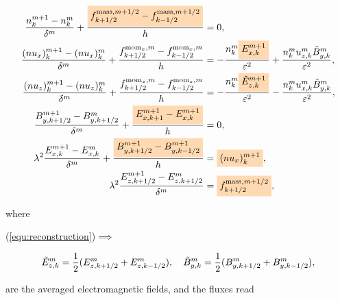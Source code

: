 \documentclass{article}
\newcommand{\mycolorbox}[2]{\colorbox{#1}{$\displaystyle#2$}}
\begin{document}
\begin{minipage}{0.6\textwidth}
\begin{align*}
    \frac{n^{m+1}_k - n^m_k}{\delta^m} + \frac{\mycolorbox{orange!30}{f^{\text{mass},m+1/2}_{k+1/2} - f^{\text{mass},m+1/2}_{k-1/2}}}{h} &= 0, \\
    \frac{(nu_x)^{m+1}_k - (nu_x)^m_k}{\delta^m} + \frac{f^{\text{mom}_x,m}_{k+1/2} - f^{\text{mom}_x,m}_{k-1/2}}{h} &= -\frac{n^m_k \mycolorbox{orange!30}{E^{m+1}_{x,k}}}{\varepsilon^2} + \frac{n^m_k u^m_{z,k}\Tilde{B}^m_{y,k}}{\varepsilon^2},\\
    \frac{(nu_z)^{m+1}_k - (nu_z)^m_k}{\delta^m} + \frac{f^{\text{mom}_z,m}_{k+1/2} - f^{\text{mom}_z,m}_{k-1/2}}{h} &= - \frac{n^m_k \mycolorbox{orange!30}{\Tilde{E}^{m+1}_{z,k}}}{\varepsilon^2} - \frac{n^m_k u^m_{x,k}\Tilde{B}^m_{y,k}}{\varepsilon^2}, \\
   \frac{B^{m+1}_{y,k+1/2} - B^{m}_{y,k+1/2}}{\delta^m} + \frac{\mycolorbox{orange!30}{E^{m+1}_{x,k+1} - E^{m+1}_{x,k}}}{h} &= 0, \\
    \lambda^2 \frac{E^{m+1}_{x,k} - E^{m}_{x,k}}{\delta^m} + \frac{\mycolorbox{orange!30}{B^{m+1}_{y,k+1/2} - B^{m+1}_{y,k-1/2}}}{h} &= \mycolorbox{orange!30}{(nu_x)^{m+1}_k}, \\
    \lambda^2 \frac{E^{m+1}_{z,k+1/2} - E^{m}_{z,k+1/2}}{\delta^m} &= \mycolorbox{orange!30}{f^{\text{mass},m+1/2}_{k+1/2}}, 
\end{align*}
\end{minipage}

\noindent where

\hspace{0.3cm}\begin{minipage}{0.1\textwidth}
    \vspace{0.3cm}
    (\ref{equ:reconstruction})$\implies$
\end{minipage}
\hspace{1cm}
\begin{minipage}{0.6\textwidth}
\begin{equation*}
     \Tilde{E}^m_{z,k} = \frac{1}{2}(E^m_{z,k+1/2} + E^m_{z,k-1/2}), \ \ \ \Tilde{B}^m_{y,k} = \frac{1}{2}(B^m_{y,k+1/2} + B^m_{y,k-1/2}),
\end{equation*}    
\end{minipage} 

\noindent are the averaged electromagnetic fields, and the fluxes read
\end{document}
